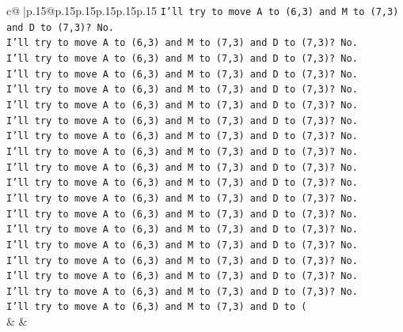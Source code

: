 \documentclass{article}
\begin{document}
{\begin{supertabular}{c@{$\;$}|p{.15\linewidth}@{}p{.15\linewidth}p{.15\linewidth}p{.15\linewidth}p{.15\linewidth}p{.15\linewidth}}
{{{\texttt{I'll try to move A to (6,3) and M to (7,3) and D to (7,3)? No.} \\
\texttt{I'll try to move A to (6,3) and M to (7,3) and D to (7,3)? No.} \\
\texttt{I'll try to move A to (6,3) and M to (7,3) and D to (7,3)? No.} \\
\texttt{I'll try to move A to (6,3) and M to (7,3) and D to (7,3)? No.} \\
\texttt{I'll try to move A to (6,3) and M to (7,3) and D to (7,3)? No.} \\
\texttt{I'll try to move A to (6,3) and M to (7,3) and D to (7,3)? No.} \\
\texttt{I'll try to move A to (6,3) and M to (7,3) and D to (7,3)? No.} \\
\texttt{I'll try to move A to (6,3) and M to (7,3) and D to (7,3)? No.} \\
\texttt{I'll try to move A to (6,3) and M to (7,3) and D to (7,3)? No.} \\
\texttt{I'll try to move A to (6,3) and M to (7,3) and D to (7,3)? No.} \\
\texttt{I'll try to move A to (6,3) and M to (7,3) and D to (7,3)? No.} \\
\texttt{I'll try to move A to (6,3) and M to (7,3) and D to (7,3)? No.} \\
\texttt{I'll try to move A to (6,3) and M to (7,3) and D to (7,3)? No.} \\
\texttt{I'll try to move A to (6,3) and M to (7,3) and D to (7,3)? No.} \\
\texttt{I'll try to move A to (6,3) and M to (7,3) and D to (7,3)? No.} \\
\texttt{I'll try to move A to (6,3) and M to (7,3) and D to (7,3)? No.} \\
\texttt{I'll try to move A to (6,3) and M to (7,3) and D to (7,3)? No.} \\
\texttt{I'll try to move A to (6,3) and M to (7,3) and D to (7,3)? No.} \\
\texttt{I'll try to move A to (6,3) and M to (7,3) and D to (} \\
            }
        }
    }
    & & \\ \\


\end{supertabular}}
\end{document}
